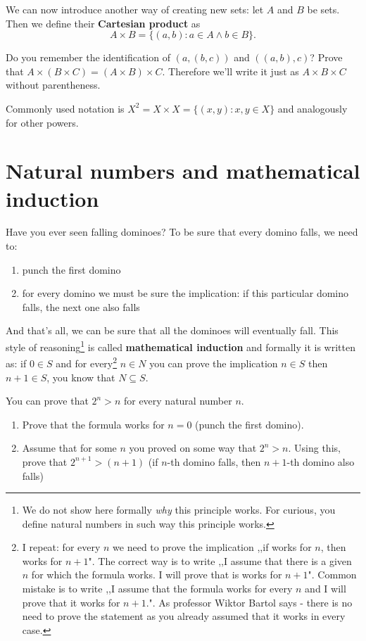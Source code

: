 \noindent We can now introduce another way of creating new sets: let $A$ and $B$ be sets. Then we define their
\textbf{Cartesian product} as
$$A\times B = \{(a,b) : a\in A\wedge b\in B\}.$$

\begin{prob}
	Do you remember the identification of $(a,(b,c))$ and $((a,b),c)$? Prove that
	$A\times (B\times C) = (A\times B)\times C$. Therefore we'll write it just as $A\times B\times C$
	without parentheness.
\end{prob}

\noindent Commonly used notation is $X^2 = X\times X = \{(x,y) : x, y \in X\}$ and analogously for other powers.

\section{Natural numbers and mathematical induction}
\label{sec:mathematical_induction}
Have you ever seen falling dominoes? To be sure that every domino falls, we need to:
\begin{enumerate}
	\item punch the first domino
	\item for every domino we must be sure the implication: if this particular domino falls, the next one also falls
\end{enumerate}
And that's all, we can be sure that all the dominoes will eventually fall. This style of reasoning\footnote{We do not show here formally \textit{why}
this principle works. For curious, you define natural numbers in such way this principle works.} is called \textbf{mathematical induction} and
formally it is written as: if $0\in S$ and for every\footnote{I repeat: for every $n$ we need to prove the implication ,,if works for $n$, then
works for $n+1$". The correct way is to write ,,I assume that there is a given $n$ for which the formula works. I will prove that is works for $n+1$".
Common mistake is to write ,,I assume that the formula works for every $n$ and I will prove that it works for $n+1$.". As professor Wiktor Bartol says
- there is no need to prove the statement as you already assumed that it works in every case.}
 $n\in N$ you can prove the implication $n\in S$ then $n+1\in S$, you know that $N\subseteq S$.
\begin{prob}
	You can prove that $2^n>n$ for every natural number $n$.
	\begin{enumerate}
		\item Prove that the formula works for $n=0$ (punch the first domino).
		\item Assume that for some $n$ you proved on some way that $2^n>n$. Using this, prove that $2^{n+1}>(n+1)$ (if $n$-th domino falls, then
		$n+1$-th domino also falls)
	\end{enumerate}
\end{prob}

